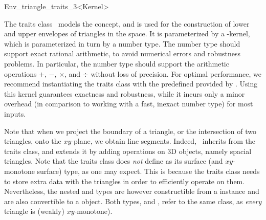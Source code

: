 
\ccRefPageBegin

\begin{ccRefClass}{Env_triangle_traits_3<Kernel>}
    
\ccDefinition 

The traits class \ccRefName\ models the 
concept, and is used for the construction of lower and upper envelopes 
of triangles in the space. It is parameterized by a \cgal-kernel,
which is parameterized in turn by a number type. The number type should 
support exact rational arithmetic, to avoid numerical errors and
robustness problems. In particular, the number type should support 
the arithmetic operations $+$, $-$, $\times$, and $\div$ without loss 
of precision. For optimal performance, we recommend instantiating the 
traits class with the predefined 
 provided by \cgal.
Using this kernel guarantees exactness and robustness, while it incurs
only a minor overhead (in comparison to working with a fast, inexact number
type) for most inputs.

Note that when we project the boundary of a triangle, or the intersection
of two triangles, onto the $xy$-plane, we obtain line segments. Indeed,
\ccRefName\ inherits from the  traits
class, and extends it by adding operations on 3D objects, namely spacial
triangles. Note that the traits class does {\sl not} define
 as its surface (and $xy$-monotone surface) type,
as one may expect. This is because the traits class needs to store extra 
data with the triangles in order to efficiently operate on them. 
Nevertheless, the nested  and  
types are however constructible from a 
instance and are also convertible to a  object.
Both types,  and , refer to the 
same class, as {\sl every} triangle is (weakly) $xy$-monotone).

 
\ccIsModel

\ccInheritsFrom

\end{ccRefClass}

\ccRefPageEnd
